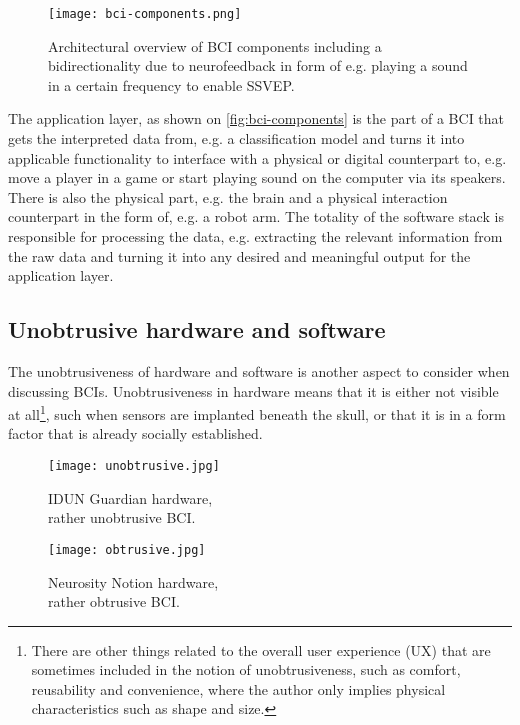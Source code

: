 \begin{figure}[ht]
  \centering
  \texttt{[image: bci-components.png]}
  \caption{Architectural overview of BCI components including a bidirectionality due to neurofeedback in form of e.g. playing a sound in a certain frequency to enable SSVEP.}
  \label{fig:bci-components}
\end{figure}

The application layer, as shown on \autoref{fig:bci-components} is the part of a BCI that gets the interpreted data from, e.g. a classification model and turns it into applicable functionality to interface with a physical or digital counterpart to, e.g. move a player in a game or start playing sound on the computer via its speakers. There is also the physical part, e.g. the brain and a physical interaction counterpart in the form of, e.g. a robot arm. The totality of the software stack is responsible for processing the data, e.g. extracting the relevant information from the raw data and turning it into any desired and meaningful output for the application layer.

\subsection{Unobtrusive hardware and software}
\label{chapter2-unobtrusive-hardware-and-software}

The unobtrusiveness of hardware and software is another aspect to consider when discussing BCIs. Unobtrusiveness in hardware means that it is either not visible at all\footnote{There are other things related to the overall user experience (UX) that are sometimes included in the notion of unobtrusiveness, such as comfort, reusability and convenience, where the author only implies physical characteristics such as shape and size.}, such when sensors are implanted beneath the skull, or that it is in a form factor that is already socially established.

\begin{figure}[!ht]
  \texttt{[image: unobtrusive.jpg]}
  \caption{IDUN Guardian hardware, \\ rather unobtrusive BCI.}
  \label{fig:unobstrusive-hardware}
  \endminipage\hfill
  \texttt{[image: obtrusive.jpg]}
  \caption{Neurosity Notion hardware, \\ rather obtrusive BCI.}
  \label{fig:obstrusive-hardware}
  \endminipage\hfill
\end{figure}

